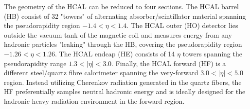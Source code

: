 The geometry of the HCAL can be reduced to four sections. The HCAL barrel (HB) consist of 32 "towers" of alternating absorber/scintillator material spanning the pseudorapidity region $-1.4<\eta<1.4$. The HCAL outer (HO) detector lies outside the vacuum tank of the magnetic coil and measures energy from any hadronic particles "leaking" through the HB, covering the pseudorapidity region $-1.26<\eta<1.26$. The HCAL endcap (HE) consists of 14 $\eta$ towers spanning the pseudorapidity range $1.3<|\eta|<3.0$. Finally, the HCAL forward (HF) is a different steel/quartz fibre calorimeter spanning the very-forward $3.0<|\eta|<5.0$ region. Instead utilizing Cherenkov radiation generated in the quartz fibers, the HF preferentially samples neutral hadronic energy and is ideally designed for the hadronic-heavy radiation environment in the forward region.

